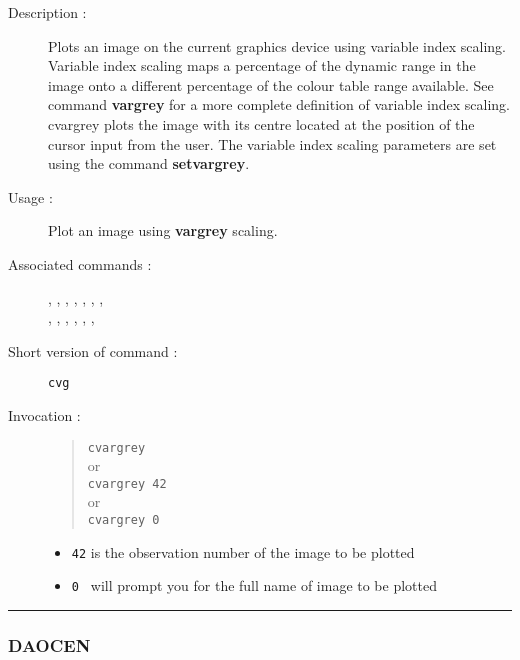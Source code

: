 \begin{description}

\item[Description :] Plots an image on the current graphics device
using variable index scaling.  Variable index scaling maps a percentage
of the dynamic range in the image onto a different percentage of the
colour table range available.  See command {\bf vargrey} for a more
complete definition of variable index scaling.  cvargrey plots the
image with its centre located at the position of the cursor input from
the user.  The variable index scaling parameters are set using the
command {\bf setvargrey}.

\item[Usage :] Plot an image using {\bf vargrey} scaling.

\item[Associated commands :] {\tt {}}, 
{\tt {}}, {\tt {}}, 
{\tt {}}, {\tt {}}, 
{\tt {}}, {\tt {}}, \\ 
{\tt {}}, {\tt {}}, 
{\tt {}}, {\tt {}}, 
{\tt {}}, {\tt {}}, 
{\tt {}}

\item[Short version of command :] {\tt cvg}
\item[Invocation :]

\begin{quote}{\tt  cvargrey }\\
or \\
{\tt cvargrey 42 }\\
or \\ 
{\tt cvargrey 0 }
\end{quote}

\begin{itemize}
\item {\tt 42} is the observation number of the image to be plotted
\item {\tt 0 } will prompt you for the full name of image to be plotted
\end{itemize}

\end{description}

\hrule 
\subsubsection*{\label{DAOCEN}DAOCEN}

